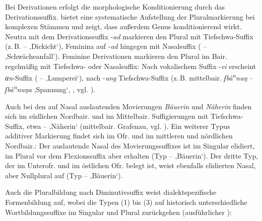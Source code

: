 Bei Derivationen erfolgt die morphologische Konditionierung durch das Derivationssuffix. \citet[§38]{Kollmer1985} bietet eine systematische Aufstellung der Pluralmarkierung bei komplexen Stämmen und zeigt, dass außerdem Genus konditionierend wirkt. Neutra mit dem Derivationssuffix -\textit{ad} markieren den Plural mit Tiefschwa-Suffix (z.\,B.  --  ‚Dickicht‘), Feminina auf -\textit{ad} hingegen mit Nasalsuffix ( --  ‚Schwächeanfall’). Feminine Derivationen markieren den Plural im Bair. regelmäßig mit Tiefschwa- oder Nasalsuffix: Nach vokalischem Suffix -\textit{ei} erscheint \textit{αn}{}-Suffix ( --  ‚Lumperei‘), nach -\textit{ung} Tiefschwa-Suffix (z.\,B. mittelbair. \textit{ʃbà\textsuperscript{n}}\textit{nuŋ} -- \textit{ʃbà\textsuperscript{n}}\textit{nuŋa} ‚Spannung‘, \citealt[92]{Gladiator1971}, vgl. \citealt[153]{Rowley1997}).

Auch bei den auf Nasal auslautenden Movierungen \textit{Bäuerin} und \textit{Näherin} finden sich im südlichen Nordbair. und im Mittelbair. Suffigierungen mit Tiefschwa-Suffix, etwa --  ‚Näherin‘ (mittelbair. Grafenau, vgl. \citealt[104]{Wildfeuer2001}). Ein weiterer Typus additiver Markierung findet sich im Ofr. und im mittleren und nördlichen Nordbair.: Der auslautende Nasal des Movierungssuffixes ist im Singular elidiert, im Plural vor dem Flexionssuffix aber erhalten (Typ  --  ‚Bäuerin‘). Der dritte Typ, der im Unterofr. und im östlichen Ofr. belegt ist, weist ebenfalls elidierten Nasal, aber Nullplural auf (Typ  --  ‚Bäuerin‘).

\begin{sloppypar}
Auch die Pluralbildung nach Diminutivsuffix weist dialektspezifische Formenbildung auf, wobei die Typen (1) bis (3) auf historisch unterschiedliche Wortbildungssuffixe im Singular und Plural zurückgehen (ausführlicher ):
\end{sloppypar}

